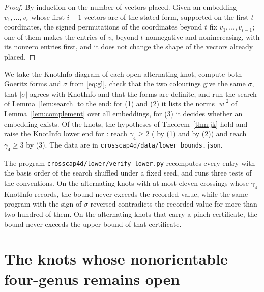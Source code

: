\documentclass[11pt]{amsart}
\theoremstyle{definition}
\theoremstyle{remark}
\numberwithin{equation}{section}
\begin{document}
\begin{proof}
By induction on the number of vectors placed. Given an embedding $v_1,\dots,v_r$ whose first
$i-1$ vectors are of the stated form, supported on the first $t$ coordinates, the signed
permutations of the coordinates beyond $t$ fix $v_1,\dots,v_{i-1}$; one of them makes the
entries of $v_i$ beyond $t$ nonnegative and nonincreasing, with its nonzero entries first,
and it does not change the shape of the vectors already placed.
\end{proof}

We take the KnotInfo diagram of each open alternating knot, compute both Goeritz forms and
$\sigma$ from \eqref{eq:gl}, check that the two colourings give the same $\sigma$, that
$|\sigma|$ agrees with KnotInfo and that the forms are definite, and run the search of
Lemma~\ref{lem:search} to the end: for (1) and (2) it lists the norms $|w|^2$ of
Lemma~\ref{lem:complement} over all embeddings, for (3) it decides whether an embedding
exists. Of the \ntotal{} knots, the hypotheses of Theorem~\ref{thm:jk} hold and raise the
KnotInfo lower end for \nlower{}: \nlowertwo{} reach $\gamma_4\ge2$ (\nlowerten{} by (1)
and \nlowertwelve{} by (2)) and \nlowerthree{} reach $\gamma_4\ge3$ by (3). The data are in
\texttt{crosscap4d/data/lower\_bounds.json}.

The program \texttt{crosscap4d/lower/verify\_lower.py} recomputes every entry with the basis
order of the search shuffled under a fixed seed, and runs three tests of the conventions. On
the alternating knots with at most eleven crossings whose $\gamma_4$ KnotInfo records, the
bound never exceeds the recorded value, while the same program with the sign of $\sigma$
reversed contradicts the recorded value for more than two hundred of them. On the
alternating knots that carry a pinch certificate, the bound never exceeds the upper bound of
that certificate.

\begin{table}[htbp]
\centering
\countstable
\caption{Open entries of $\gamma_4$ in KnotInfo 2026.10.5 and what the certificates give.
``Settled'': the value is now known; ``lowered'': the upper bound is lower.}
\label{tab:counts}
\end{table}

\section{The knots whose nonorientable four-genus remains open}\label{sec:gopen}
\end{document}
